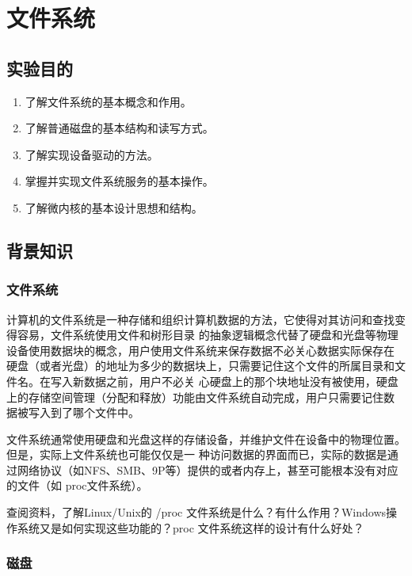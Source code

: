 \chapter{文件系统}

\section{实验目的}
  \begin{enumerate}
    \item 了解文件系统的基本概念和作用。
    \item 了解普通磁盘的基本结构和读写方式。
    \item 了解实现设备驱动的方法。
    \item 掌握并实现文件系统服务的基本操作。
    \item 了解微内核的基本设计思想和结构。
  \end{enumerate}

\section{背景知识}

\subsection{文件系统}

计算机的文件系统是一种存储和组织计算机数据的方法，它使得对其访问和查找变得容易，文件系统使用文件和树形目录
的抽象逻辑概念代替了硬盘和光盘等物理设备使用数据块的概念，用户使用文件系统来保存数据不必关心数据实际保存在
硬盘（或者光盘）的地址为多少的数据块上，只需要记住这个文件的所属目录和文件名。在写入新数据之前，用户不必关
心硬盘上的那个块地址没有被使用，硬盘上的存储空间管理（分配和释放）功能由文件系统自动完成，用户只需要记住数
据被写入到了哪个文件中。

文件系统通常使用硬盘和光盘这样的存储设备，并维护文件在设备中的物理位置。但是，实际上文件系统也可能仅仅是一
种访问数据的界面而已，实际的数据是通过网络协议（如NFS、SMB、9P等）提供的或者内存上，甚至可能根本没有对应
的文件（如 proc文件系统）。

\begin{thinking}\label{think-proc}
查阅资料，了解Linux/Unix的 /proc 文件系统是什么？有什么作用？Windows操作系统又是如何实现这些功能的？proc
文件系统这样的设计有什么好处？
\end{thinking}

\subsection{磁盘}

